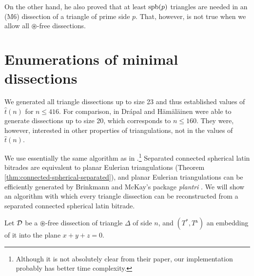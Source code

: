 On the other hand, he also proved that at least $\mathop{\mathrm{spb}}(p)$ triangles are needed in an (M6) dissection of a triangle of prime side $p$. That, however, is not true when we allow all $\circledast$-free dissections.


\section{Enumerations of minimal dissections}

We generated all triangle dissections up to size 23 and thus established values of $\hat t(n)$ for $n \leq 416$. For comparison, in \cite{DrapalHamalainen10} Drápal and Hämäläinen were able to generate dissections up to size 20, which corresponds to $n \leq 160$. They were, however, interested in other properties of triangulations, not in the values of $\hat t(n)$.

We use essentially the same algorithm as in \cite{DrapalHamalainen10}.\footnote{Although it is not absolutely clear from their paper, our implementation probably has better time complexity.} Separated connected spherical latin bitrades are equivalent to planar Eulerian triangulations (Theorem \ref{thm:connected-spherical-separated}), and planar Eulerian triangulations can be efficiently generated by Brinkmann and McKay's package \emph{plantri} \cite{BrinkmannMcKay99}. We will show an algorithm with which every triangle dissection can be reconstructed from a separated connected spherical latin bitrade.

\bigskip

Let $\mathcal D$ be a $\circledast$-free dissection of triangle $\Delta$ of side $n$, and $(T^*, T^\vartriangle)$ an embedding of it into the plane $x+y+z=0$.

